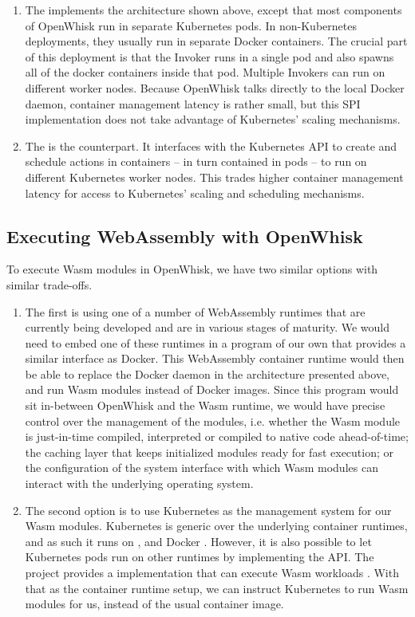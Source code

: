 \begin{enumerate}
    \item The  implements the architecture shown above, except that most components of OpenWhisk run in separate Kubernetes pods. In non-Kubernetes deployments, they usually run in separate Docker containers. The crucial part of this deployment is that the Invoker runs in a single pod and also spawns all of the docker containers inside that pod. Multiple Invokers can run on different worker nodes. Because OpenWhisk talks directly to the local Docker daemon, container management latency is rather small, but this SPI implementation does not take advantage of Kubernetes' scaling mechanisms.
    \item The  is the counterpart. It interfaces with the Kubernetes API to create and schedule actions in containers -- in turn contained in pods -- to run on different Kubernetes worker nodes. This trades higher container management latency for access to Kubernetes' scaling and scheduling mechanisms.
\end{enumerate}

\subsection{Executing WebAssembly with OpenWhisk}

To execute Wasm modules in OpenWhisk, we have two similar options with similar trade-offs.

\begin{enumerate}
    \item The first is using one of a number of WebAssembly runtimes that are currently being developed and are in various stages of maturity. We would need to embed one of these runtimes in a program of our own that provides a similar interface as Docker. This WebAssembly container runtime would then be able to replace the Docker daemon in the architecture presented above, and run Wasm modules instead of Docker images. Since this program would sit in-between OpenWhisk and the Wasm runtime, we would have precise control over the management of the modules, i.e. whether the Wasm module is just-in-time compiled, interpreted or compiled to native code ahead-of-time; the caching layer that keeps initialized modules ready for fast execution; or the configuration of the system interface with which Wasm modules can interact with the underlying operating system.
    \item The second option is to use Kubernetes as the management system for our Wasm modules. Kubernetes is generic over the underlying container runtimes, and as such it runs on ,  and Docker \cite{Kub2021}. However, it is also possible to let Kubernetes pods run on other runtimes by implementing the  API. The  project provides a  implementation that can execute Wasm workloads \cite{Krustlet2021}. With that as the container runtime setup, we can instruct Kubernetes to run Wasm modules for us, instead of the usual container image.
\end{enumerate}

